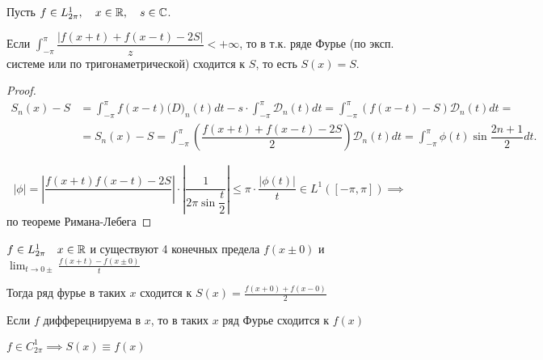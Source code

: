 
\begin{statement}

    Пусть $f \in L_{2\pi}^1,~~~ x\in\mathbb{R}, ~~~s \in \mathbb{C}$.

    Если $\int_{-\pi}^\pi \dfrac{| f(x +t ) + f(x - t) - 2S |}{z} < +\infty$, то в т.к. ряде Фурье (по эксп. системе или по тригонаметрической) сходится к $S$, то есть $S(x) = S$.
\end{statement}

\begin{proof}
    \begin{align*}
        S_n(x) - S &= \int_{-\pi}^\pi f(x -t) \mathcal(D)_n (t) dt - s \cdot \int_{-\pi}^\pi \mathcal{D}_n (t) dt = \int_{-\pi}^\pi  \left( f(x -t) - S \right) \mathcal{D}_n (t) dt = \\
        &= S_n(x) - S = \int_{-\pi}^\pi \left(\dfrac{f(x + t) + f(x - t) - 2 S}{2} \right) \mathcal{D}_n(t) dt = \int_{-\pi}^\pi \phi(t) \sin \dfrac{2n + 1}{2} dt
        .
    \end{align*}

    \[ |\phi | = \left| \dfrac{f(x + t) f(x - t) - 2S}{ }\right| \cdot \left| \dfrac{1}{2 \pi \sin \dfrac{t}{2}} \right|\leqslant \pi \cdot \dfrac{|\phi (t)|}{t}\in L^1 ([-\pi, \pi]) \implies\]
    по теореме Римана-Лебега
\end{proof}


\begin{corollary}
    $f\in L^1_{2\pi}\quad x\in \mathbb{R}$ и существуют 4 конечных предела $f(x\pm 0)$ и $\lim_{t\to 0\pm} \frac{f(x+t) - f(x\pm 0)}{t}$

    Тогда ряд фурье в таких $x$ сходится к $S(x) = \frac{f(x+0) + f(x - 0)}{2}$
\end{corollary}

\begin{corollary}
    Если $f$ дифферецнируема в $x$, то в таких $x$ ряд Фурье сходится к $f(x)$
\end{corollary}
\begin{corollary}
    $f\in C_{2\pi}^1 \implies S(x)\equiv f(x)$
\end{corollary}

